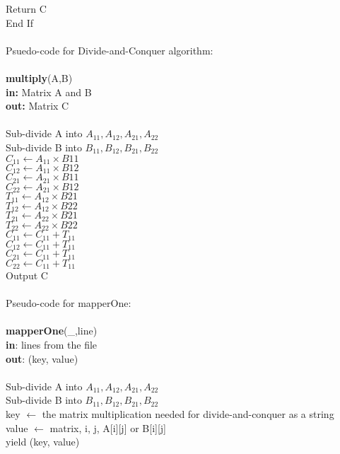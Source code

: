 \documentclass[10pt,a4paper]{article}
\begin{document}
\indent	Return C\\
End If\\\\
Psuedo-code for Divide-and-Conquer algorithm:\\\\
\textbf{multiply}(A,B)\\
\textbf{in:} Matrix A and B\\
\textbf{out:} Matrix C\\\\
Sub-divide A into $A_{11},A_{12}, A_{21}, A_{22}$\\
Sub-divide B into $B_{11},B_{12}, B_{21}, B_{22}$\\
$C_{11}\leftarrow A_{11}\times B{11}$\\
$C_{12}\leftarrow A_{11}\times B{12}$\\
$C_{21}\leftarrow A_{21}\times B{11}$\\
$C_{22}\leftarrow A_{21}\times B{12}$\\
$T_{11}\leftarrow A_{12}\times B{21}$\\
$T_{12}\leftarrow A_{12}\times B{22}$\\
$T_{21}\leftarrow A_{22}\times B{21}$\\
$T_{22}\leftarrow A_{22}\times B{22}$\\
$C_11 \leftarrow C_{11}+T_{11}$\\
$C_12 \leftarrow C_{11}+T_{11}$\\
$C_21 \leftarrow C_{11}+T_{11}$\\
$C_22 \leftarrow C_{11}+T_{11}$\\
Output C\\\\
Pseudo-code for mapperOne:\\\\
\textbf{mapperOne}(\_,line)\\
\textbf{in}: lines from the file\\
\textbf{out}: (key, value)\\\\
Sub-divide A into $A_{11},A_{12}, A_{21}, A_{22}$\\
Sub-divide B into $B_{11},B_{12}, B_{21}, B_{22}$\\
key  $\leftarrow$ the matrix multiplication needed for divide-and-conquer as a string\\
value  $\leftarrow$ matrix, i, j, A[i][j] or B[i][j]\\
yield (key, value)\\ \\ \\ 
\end{document}
